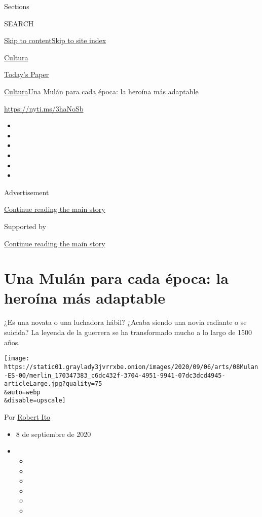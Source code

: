 Sections

SEARCH

\protect\hyperlink{site-content}{Skip to
content}\protect\hyperlink{site-index}{Skip to site index}

\href{https://www.nytimes3xbfgragh.onion/es/section/cultura}{Cultura}

\href{https://myaccount.nytimes3xbfgragh.onion/auth/login?response_type=cookie\&client_id=vi}{}

\href{https://www.nytimes3xbfgragh.onion/section/todayspaper}{Today's
Paper}

\href{/es/section/cultura}{Cultura}\textbar{}Una Mulán para cada época:
la heroína más adaptable

\url{https://nyti.ms/3haNoSb}

\begin{itemize}
\item
\item
\item
\item
\item
\item
\end{itemize}

Advertisement

\protect\hyperlink{after-top}{Continue reading the main story}

Supported by

\protect\hyperlink{after-sponsor}{Continue reading the main story}

\hypertarget{una-muluxe1n-para-cada-uxe9poca-la-herouxedna-muxe1s-adaptable}{%
\section{Una Mulán para cada época: la heroína más
adaptable}\label{una-muluxe1n-para-cada-uxe9poca-la-herouxedna-muxe1s-adaptable}}

¿Es una novata o una luchadora hábil? ¿Acaba siendo una novia radiante o
se suicida? La leyenda de la guerrera se ha transformado mucho a lo
largo de 1500 años.

\texttt{[image: https://static01.graylady3jvrrxbe.onion/images/2020/09/06/arts/08Mulan-ES-00/merlin\_170347383\_c6dc432f-3704-4951-9941-07dc3dcd4945-articleLarge.jpg?quality=75\\\&auto=webp\\\&disable=upscale]}

Por \href{https://www.nytimes3xbfgragh.onion/by/robert-ito}{Robert Ito}

\begin{itemize}
\item
  8 de septiembre de 2020
\item
  \begin{itemize}
  \item
  \item
  \item
  \item
  \item
  \item
  \end{itemize}
\end{itemize}

